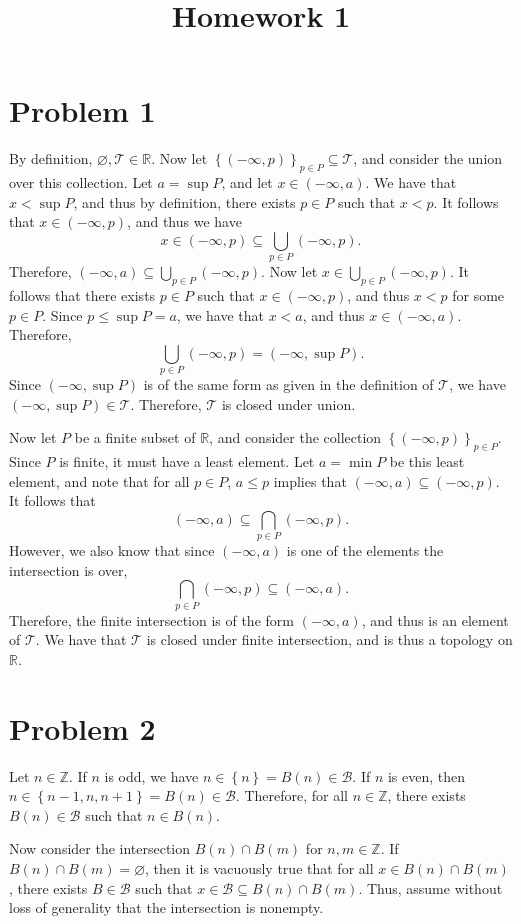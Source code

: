 \documentclass[11pt, letterpaper]{article}
\title{Homework 1}
\begin{document}
\makeproblem
\section*{Problem 1}
By definition, $\varnothing ,\mathcal{T} \in\mathbb{R} $. Now let $\left\{ (-\infty ,p) \right\}_{p\in P} \subseteq \mathcal{T} $, and consider the union over this collection. Let $a=\sup  P$, and let $x\in (-\infty ,a)$. We have that $x<\sup P$, and thus by definition, there exists $p\in P$ such that $x<p$. It follows that $x\in (-\infty ,p)$, and thus we have
\[
	x\in (-\infty ,p) \subseteq \bigcup_{p\in P} (-\infty ,p)
.\]
Therefore, $(-\infty ,a)\subseteq \bigcup_{p\in P} (-\infty ,p)$. Now let $x\in \bigcup_{p\in P} (-\infty ,p)$. It follows that there exists $p\in P $ such that $x\in (-\infty ,p)$, and thus $x<p$ for some $p\in P$. Since $p\leq \sup P=a$, we have that $x<a$, and thus $x\in (-\infty ,a)$. Therefore,
\[
	\bigcup_{p\in P} (-\infty ,p)=(-\infty ,\sup P)
.\]
Since $(-\infty ,\sup P)$ is of the same form as given in the definition of $\mathcal{T} $, we have $(-\infty ,\sup P)\in \mathcal{T} $. Therefore, $\mathcal{T} $ is closed under union.

Now let $P$ be a finite subset of $\mathbb{R} $, and consider the collection $\left\{ (-\infty ,p) \right\}_{p\in P} $. Since $P$ is finite, it must have a least element. Let $a= \min P$ be this least element, and note that for all $p\in P$, $a\leq p$ implies that $(-\infty ,a)\subseteq (-\infty ,p)$. It follows that
\[
	(-\infty ,a)\subseteq \bigcap_{p\in P} (-\infty ,p)
.\]
However, we also know that since $(-\infty ,a)$ is one of the elements the intersection is over,
\[
	\bigcap_{p\in P} (-\infty ,p) \subseteq (-\infty ,a)
.\]
Therefore, the finite intersection is of the form $(-\infty ,a)$, and thus is an element of $\mathcal{T} $. We have that $\mathcal{T} $ is closed under finite intersection, and is thus a topology on $\mathbb{R} $.
\section*{Problem 2}
Let $n\in\mathbb{Z} $. If $n$ is odd, we have $n\in \left\{ n \right\}=B(n) \in \mathcal{B} $. If $n$ is even, then $n\in \left\{ n-1,n,n+1 \right\}=B(n) \in \mathcal{B} $. Therefore, for all $n\in\mathbb{Z} $, there exists $B(n)\in \mathcal{B} $ such that $n\in B(n)$.

Now consider the intersection $B(n)\cap B(m)$ for $n,m\in\mathbb{Z} $. If $B(n)\cap B(m)=\varnothing $, then it is vacuously true that for all $x\in B(n)\cap B(m)$, there exists $B\in \mathcal{B} $ such that $x\in \mathcal{B} \subseteq B(n)\cap B(m)$. Thus, assume without loss of generality that the intersection is nonempty.
\end{document}

